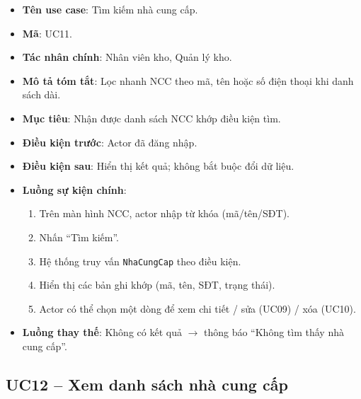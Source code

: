 \begin{itemize}[leftmargin=1.5cm]
    \item \textbf{Tên use case}: Tìm kiếm nhà cung cấp.
    \item \textbf{Mã}: UC11.
    \item \textbf{Tác nhân chính}: Nhân viên kho, Quản lý kho.
    \item \textbf{Mô tả tóm tắt}: Lọc nhanh NCC theo mã, tên hoặc số điện thoại khi danh sách dài.
    \item \textbf{Mục tiêu}: Nhận được danh sách NCC khớp điều kiện tìm.
    \item \textbf{Điều kiện trước}: Actor đã đăng nhập.
    \item \textbf{Điều kiện sau}: Hiển thị kết quả; không bắt buộc đổi dữ liệu.
    \item \textbf{Luồng sự kiện chính}:
    \begin{enumerate}
        \item Trên màn hình NCC, actor nhập từ khóa (mã/tên/SĐT).
        \item Nhấn ``Tìm kiếm''.
        \item Hệ thống truy vấn \texttt{NhaCungCap} theo điều kiện.
        \item Hiển thị các bản ghi khớp (mã, tên, SĐT, trạng thái).
        \item Actor có thể chọn một dòng để xem chi tiết / sửa (UC09) / xóa (UC10).
    \end{enumerate}
    \item \textbf{Luồng thay thế}: Không có kết quả $\rightarrow$ thông báo ``Không tìm thấy nhà cung cấp''.
\end{itemize}

\subsection{UC12 -- Xem danh sách nhà cung cấp}

